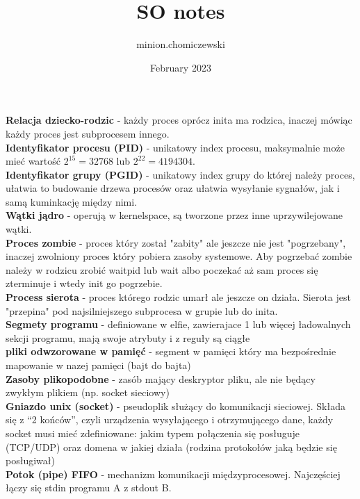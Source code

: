 \documentclass{article}
\title{SO notes}
\author{minion.chomiczewski }
\date{February 2023}
\begin{document}
\textbf{Relacja dziecko-rodzic} - każdy proces oprócz inita ma rodzica, inaczej mówiąc każdy proces jest subprocesem innego. 
\\ \textbf{Identyfikator procesu (PID)} - unikatowy index procesu, maksymalnie może mieć wartość $2^{15} = 32768$ lub $2^{22} = 4194304$.
\\ \textbf{Identyfikator grupy (PGID)} - unikatowy index grupy do której należy proces, ułatwia to budowanie drzewa procesów oraz ułatwia wysyłanie sygnałów, jak i samą kuminkację między nimi. 
\\ \textbf{Wątki jądro} - operują w kernelspace, są tworzone przez inne uprzywilejowane wątki. 
\\ \textbf{Proces zombie} - proces który został "zabity" ale jeszcze nie jest "pogrzebany", inaczej zwolniony proces który pobiera zasoby systemowe. Aby pogrzebać zombie należy w rodzicu zrobić waitpid lub wait albo poczekać aż sam proces się zterminuje i wtedy init go pogrzebie. 
\\ \textbf{Process sierota} - proces którego rodzic umarł ale jeszcze on działa. Sierota jest "przepina" pod najsilniejszego subprocesa w grupie lub do inita. 
\\ \textbf{Segmety programu} - definiowane w elfie, zawierajace 1 lub więcej ładowalnych sekcji programu, mają swoje atrybuty i z reguły są ciągłe
\\ \textbf{pliki odwzorowane w pamięć} - segment w pamięci który ma bezpośrednie mapowanie w nazej pamięci (bajt do bajta)
\\ \textbf{Zasoby plikopodobne} - zasób mający deskryptor pliku, ale nie będący zwykłym plikiem (np. socket sieciowy)
\\ \textbf{Gniazdo unix (socket)} - pseudoplik służący do komunikacji sieciowej. Składa się z “2 końców”, czyli urządzenia wysyłającego i otrzymującego dane, każdy socket musi mieć zdefiniowane: jakim typem połączenia się posługuje (TCP/UDP) oraz domena w jakiej działa (rodzina protokołów jaką będzie się posługiwał)
\\ \textbf{Potok (pipe) FIFO} - mechanizm komunikacji międzyprocesowej. Najczęściej łączy się stdin programu A z stdout B.
\end{document}
